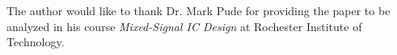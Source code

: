 \documentclass[journal]{IEEEtran}
\begin{document}
The author would like to thank Dr. Mark Pude for providing the paper to be analyzed in his course \emph{Mixed-Signal IC Design} at Rochester Institute of Technology.


\ifCLASSOPTIONcaptionsoff
  \newpage
\fi





%
%
%






% 











\end{document}

